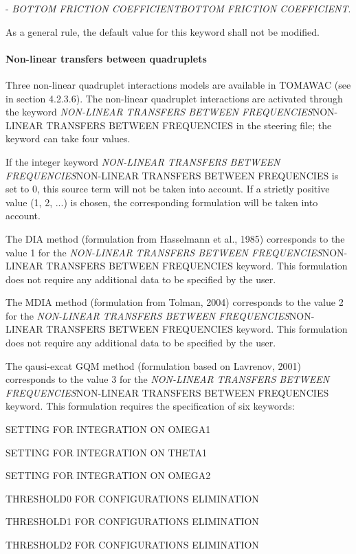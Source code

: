   - \textit{BOTTOM FRICTION COEFFICIENTBOTTOM FRICTION COEFFICIENT}.

 As a general rule, the default value for this keyword shall not be modified.


\paragraph{ Non-linear transfers between quadruplets}

 Three non-linear quadruplet interactions models are available in TOMAWAC (see in section 4.2.3.6). The non-linear quadruplet interactions are activated through the keyword \textit{NON-LINEAR TRANSFERS BETWEEN FREQUENCIES}NON-LINEAR TRANSFERS BETWEEN FREQUENCIES\textit{ }in the steering file; the keyword can take four values.

 If the integer keyword \textit{NON-LINEAR TRANSFERS BETWEEN FREQUENCIES}NON-LINEAR TRANSFERS BETWEEN FREQUENCIES is set to 0, this source term will not be taken into account. If a strictly positive value (1, 2, ...) is chosen, the corresponding formulation will be taken into account.

 The DIA method (formulation from Hasselmann et al., 1985) corresponds to the value 1 for the \textit{NON-LINEAR TRANSFERS BETWEEN FREQUENCIES}NON-LINEAR TRANSFERS BETWEEN FREQUENCIES keyword. This formulation does not require any additional data to be specified by the user.

 The MDIA method (formulation from Tolman, 2004) corresponds to the value 2 for the \textit{NON-LINEAR TRANSFERS BETWEEN FREQUENCIES}NON-LINEAR TRANSFERS BETWEEN FREQUENCIES keyword. This formulation does not require any additional data to be specified by the user.

 The qausi-excat GQM method (formulation based on Lavrenov, 2001) corresponds to the value 3 for the \textit{NON-LINEAR TRANSFERS BETWEEN FREQUENCIES}NON-LINEAR TRANSFERS BETWEEN FREQUENCIES keyword. This formulation requires the specification of six keywords:

 SETTING FOR INTEGRATION ON OMEGA1

 SETTING FOR INTEGRATION ON THETA1

 SETTING FOR INTEGRATION ON OMEGA2

 THRESHOLD0 FOR CONFIGURATIONS ELIMINATION

 THRESHOLD1 FOR CONFIGURATIONS ELIMINATION

 THRESHOLD2 FOR CONFIGURATIONS ELIMINATION




